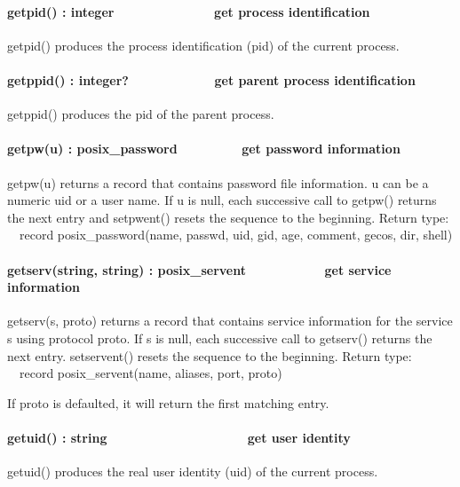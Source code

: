 \paragraph[getpid() : integer\ \ \ \ \ \ \ \ \ \ \ \  \ \ get process
identification]{getpid() : integer\ \ \ \ \ \ \ \ \ \ \ \  \ \ get
process identification}
getpid() produces the process identification (pid) of the current
process.

\paragraph[getppid() : integer?\ \ \ \ \ \ \ \ \ \  \ \ get parent
process identification]{getppid() : integer?\ \ \ \ \ \ \ \ \ \ 
\ \ get parent process identification}
getppid() produces the pid of the parent process.

\paragraph[getpw(u) : posix\_password\ \ \ \ \ \ \ \  \ get password
information]{getpw(u) : posix\_password\ \ \ \ \ \ \ \  \ get password
information}
getpw(u) returns a record that contains password file information. u can
be a numeric uid or a user name. If u is null, each successive call to
getpw() returns the next entry and setpwent() resets the sequence to
the beginning. Return type:\\
\ \ record posix\_password(name, passwd, uid, gid, age, comment, gecos,
dir, shell)

\paragraph[getserv(string, string) : posix\_servent\ \ \ \ \ \ 
\ \ \ \ \ get service information]{getserv(string, string) :
posix\_servent\ \ \ \ \ \  \ \ \ \ \ get service information}
getserv(s, proto) returns a record that contains service information for
the service s using protocol proto. If s is null, each successive call
to getserv() returns the next entry. setservent() resets the sequence
to the beginning. Return type:\\
\ \ record posix\_servent(name, aliases, port, proto) 

If proto is defaulted, it will return the first matching entry. 

\paragraph[getuid() : string \ \ \ \ \ \ \ \ \ \ \ \ \ \  \ \ \ \ \ get
user identity]{getuid() : string \ \ \ \ \ \ \ \ \ \ \ \ \ \ 
\ \ \ \ \ get user identity}
getuid() produces the real user identity (uid) of the current process. 

